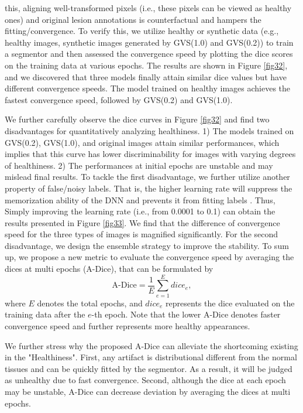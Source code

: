 \documentclass[journal,twoside,web]{ieeecolor}
\begin{document}
this, aligning well-transformed pixels (i.e., these pixels can be viewed as healthy ones) and original lesion annotations is counterfactual and hampers the fitting/convergence. To verify this, we utilize healthy or synthetic data (e.g., healthy images, synthetic images generated by GVS(1.0) and GVS(0.2)) to train a segmentor and then assessed the convergence speed by plotting the dice scores on the training data at various epochs. The results are shown in Figure \ref{fig32}, and we discovered that three models finally attain similar dice values but have different convergence speeds. The model trained on healthy images achieves the fastest convergence speed, followed by GVS(0.2) and GVS(1.0).

We further carefully observe the dice curves in Figure \ref{fig32} and find two disadvantages for quantitatively analyzing healthiness. 1) The models trained on GVS(0.2), GVS(1.0), and original images attain similar performances, which implies that this curve has lower discriminability for images with varying degrees of healthiness. 2) The performances at initial epochs are unstable and may mislead final results. To tackle the first disadvantage, we further utilize another property of false/noisy labels. That is, the higher learning rate will suppress the memorization ability of the DNN and prevents it from fitting labels \cite{Tanaka2018JointOF}. Thus, Simply improving the learning rate (i.e., from 0.0001 to 0.1) can obtain the results presented in Figure \ref{fig33}. We find that the difference of convergence speed for the three types of images is magnified significantly. For the second disadvantage, we design the ensemble strategy to improve the stability. To sum up, we propose a new metric to evaluate the convergence speed by averaging the dices at multi epochs (A-Dice), that can be formulated by
\begin{equation}
	\text{A-Dice} = \frac{1}{E}\sum_{e=1}^{E} dice_e,
\end{equation} 
where $E$ denotes the total epochs, and $dice_e$ represents the dice evaluated on the training data after the $e$-th epoch. Note that the lower A-Dice denotes faster convergence speed and further represents more healthy appearances.

We further stress why the proposed A-Dice can alleviate the shortcoming existing in the "Healthiness". First, any artifact is distributional different from the normal tissues and can be quickly fitted by the segmentor. As a result, it will be judged as unhealthy due to fast convergence. Second, although the dice at each epoch may be unstable, A-Dice can decrease deviation by averaging the dices at multi epochs.
\end{document}
